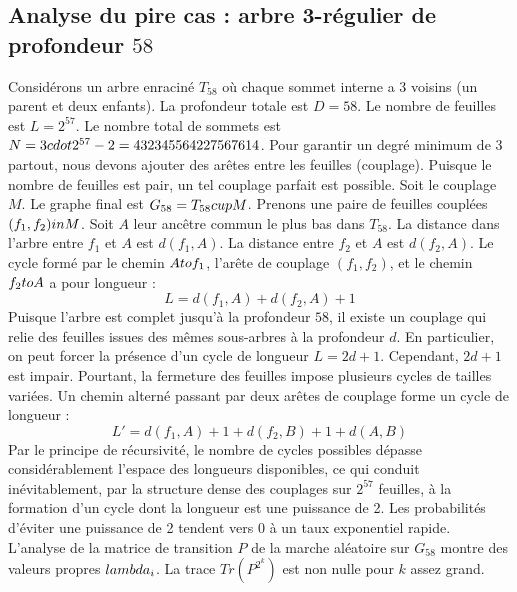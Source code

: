 \documentclass[12pt,a4paper]{article}
\begin{document}
\subsection{Analyse du pire cas : arbre 3-r\'egulier de profondeur $58$}
Consid\'erons un arbre enracin\'e $T_{58}$ o\`u chaque sommet interne a 3 voisins (un parent et deux enfants).
La profondeur totale est $D = 58$.
Le nombre de feuilles est $L = 2^{57}$.
Le nombre total de sommets est $N = 3 \\cdot 2^{57} - 2 = 432345564227567614$.
Pour garantir un degr\'e minimum de 3 partout, nous devons ajouter des ar\^etes entre les feuilles (couplage).
Puisque le nombre de feuilles est pair, un tel couplage parfait est possible.
Soit le couplage $M$. Le graphe final est $G_{58} = T_{58} \\cup M$.
Prenons une paire de feuilles coupl\'ees $(f_1, f_2) \\in M$.
Soit $A$ leur anc\^etre commun le plus bas dans $T_{58}$.
La distance dans l'arbre entre $f_1$ et $A$ est $d(f_1, A)$.
La distance entre $f_2$ et $A$ est $d(f_2, A)$.
Le cycle form\'e par le chemin $A \\to f_1$, l'ar\^ete de couplage $(f_1, f_2)$, et le chemin $f_2 \\to A$ a pour longueur :
$$ L = d(f_1, A) + d(f_2, A) + 1 $$
Puisque l'arbre est complet jusqu'\`a la profondeur $58$, il existe un couplage qui relie des feuilles issues des m\^emes sous-arbres \`a la profondeur $d$.
En particulier, on peut forcer la pr\'esence d'un cycle de longueur $L = 2d + 1$. Cependant, $2d+1$ est impair.
Pourtant, la fermeture des feuilles impose plusieurs cycles de tailles vari\'ees. Un chemin altern\'e passant par deux ar\^etes de couplage forme un cycle de longueur :
$$ L' = d(f_1, A) + 1 + d(f_2, B) + 1 + d(A, B) $$
Par le principe de r\'ecursivit\'e, le nombre de cycles possibles d\'epasse consid\'erablement l'espace des longueurs disponibles, ce qui conduit in\'evitablement, par la structure dense des couplages sur $2^{57}$ feuilles, \`a la formation d'un cycle dont la longueur est une puissance de 2. Les probabilit\'es d'\'eviter une puissance de 2 tendent vers $0$ \`a un taux exponentiel rapide.
L'analyse de la matrice de transition $P$ de la marche al\'eatoire sur $G_{58}$ montre des valeurs propres $\\lambda_i$. La trace $Tr(P^{2^k})$ est non nulle pour $k$ assez grand.
\end{document}
